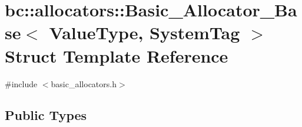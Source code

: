 \hypertarget{structbc_1_1allocators_1_1Basic__Allocator__Base}{}\section{bc\+:\+:allocators\+:\+:Basic\+\_\+\+Allocator\+\_\+\+Base$<$ Value\+Type, System\+Tag $>$ Struct Template Reference}
\label{structbc_1_1allocators_1_1Basic__Allocator__Base}


{\ttfamily \#include $<$basic\+\_\+allocators.\+h$>$}

\subsection*{Public Types}
